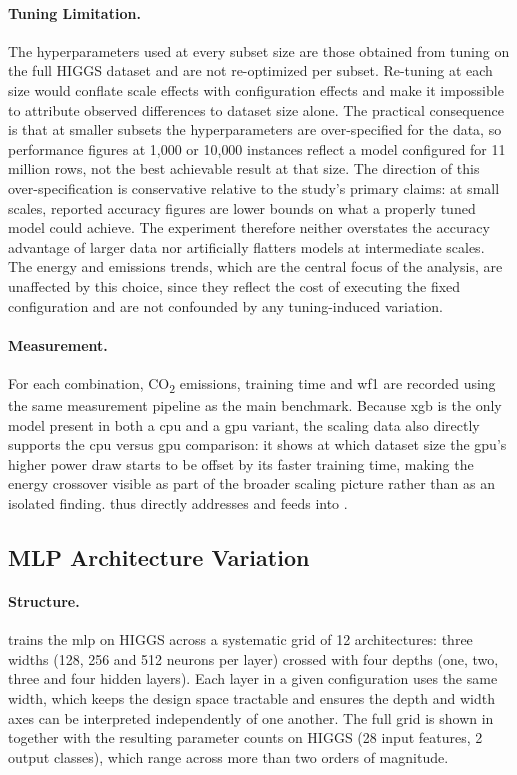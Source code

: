 \paragraph{Tuning Limitation.}
The hyperparameters used at every subset size are those obtained from tuning on the full HIGGS dataset and are not re-optimized per subset. Re-tuning at each size would conflate scale effects with configuration effects and make it impossible to attribute observed differences to dataset size alone. The practical consequence is that at smaller subsets the hyperparameters are over-specified for the data, so performance figures at 1{,}000 or 10{,}000 instances reflect a model configured for 11 million rows, not the best achievable result at that size. The direction of this over-specification is conservative relative to the study's primary claims: at small scales, reported accuracy figures are lower bounds on what a properly tuned model could achieve. The experiment therefore neither overstates the accuracy advantage of larger data nor artificially flatters models at intermediate scales. The energy and emissions trends, which are the central focus of the analysis, are unaffected by this choice, since they reflect the cost of executing the fixed configuration and are not confounded by any tuning-induced variation.

\paragraph{Measurement.}
For each combination, CO\textsubscript{2} emissions, training time and \gls{wf1} are recorded using the same measurement pipeline as the main benchmark. Because \gls{xgb} is the only model present in both a \gls{cpu} and a \gls{gpu} variant, the scaling data also directly supports the \gls{cpu} versus \gls{gpu} comparison: it shows at which dataset size the \gls{gpu}'s higher power draw starts to be offset by its faster training time, making the energy crossover visible as part of the broader scaling picture rather than as an isolated finding.  thus directly addresses  and feeds into .

\subsection{MLP Architecture Variation}
\label{design_mlp_variation}\label{exp:3}

\paragraph{Structure.}
 trains the \gls{mlp} on HIGGS across a systematic grid of 12 architectures: three widths (128, 256 and 512 neurons per layer) crossed with four depths (one, two, three and four hidden layers). Each layer in a given configuration uses the same width, which keeps the design space tractable and ensures the depth and width axes can be interpreted independently of one another. The full grid is shown in  together with the resulting parameter counts on HIGGS (28 input features, 2 output classes), which range across more than two orders of magnitude.

